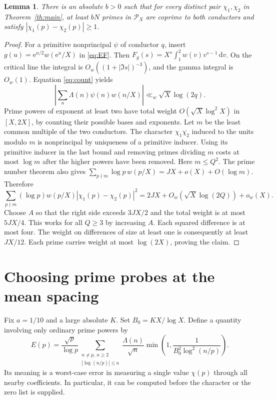 \documentclass[11pt]{article}
\newtheorem{lemma}[theorem]{Lemma}
\newcommand{\me}{\mathrm e}
\newcommand{\dd}{\,\mathrm d}
\newcommand{\abs}[1]{\left|#1\right|}
\newcommand{\PP}{\mathcal P}
\begin{document}
\begin{lemma}\label{lem:witness}
There is an absolute $b>0$ such that for every distinct pair $\chi_1,\chi_2$ in Theorem~\ref{th:main}, at least $bN$ primes in $\PP_X$ are coprime to both conductors and satisfy $|\chi_1(p)-\chi_2(p)|\ge1$.
\end{lemma}
\begin{proof}
For a primitive nonprincipal $\psi$ of conductor $q$, insert $g(u)=\me^{u/2}w(\me^u/X)$ in \eqref{eq:EF}. Then
$F_g(s)=X^s\int_1^2 w(v)v^{s-1}\dd v$. On the critical line the integral is $O_w((1+|\Im s|)^{-3})$, and the gamma integral is $O_w(1)$. Equation \eqref{eq:count} yields
\[
 \abs{\sum_n\Lambda(n)\psi(n)w(n/X)}\ll_w \sqrt X\log(2q).
\]
Prime powers of exponent at least two have total weight $O(\sqrt X\log^2 X)$ in $[X,2X]$, by counting their possible bases and exponents. Let $m$ be the least common multiple of the two conductors. The character $\chi_1\overline{\chi_2}$ induced to the units modulo $m$ is nonprincipal by uniqueness of a primitive inducer. Using its primitive inducer in the last bound and removing primes dividing $m$ costs at most $\log m$ after the higher powers have been removed. Here $m\le Q^2$. The prime number theorem also gives $\sum_{p\nmid m}\log p\,w(p/X)=JX+o(X)+O(\log m)$. Therefore
\[
 \sum_{p\nmid m} (\log p)w(p/X)|\chi_1(p)-\chi_2(p)|^2
 =2JX+O_w(\sqrt X\log(2Q))+o_w(X).
\]
Choose $A$ so that the right side exceeds $3JX/2$ and the total weight is at most $5JX/4$. This works for all $Q\ge3$ by increasing $A$. Each squared difference is at most four. The weight on differences of size at least one is consequently at least $JX/12$. Each prime carries weight at most $\log(2X)$, proving the claim.
\end{proof}

\section{Choosing prime probes at the mean spacing}
Fix $a=1/10$ and a large absolute $K$. Set $B_0=KX/\log X$. Define a quantity involving only ordinary prime powers by
\begin{equation}
 E(p)=\frac{\sqrt p}{\log p}
 \sum_{\substack{n\ne p,\,n\ge2\\ |\log(n/p)|\le a}}
 \frac{\Lambda(n)}{\sqrt n}
 \min\left(1,\frac{1}{B_0^2\log^2(n/p)}\right).
 \label{eq:leak}
\end{equation}
Its meaning is a worst-case error in measuring a single value $\chi(p)$ through all nearby coefficients. In particular, it can be computed before the character or the zero list is supplied.
\end{document}
